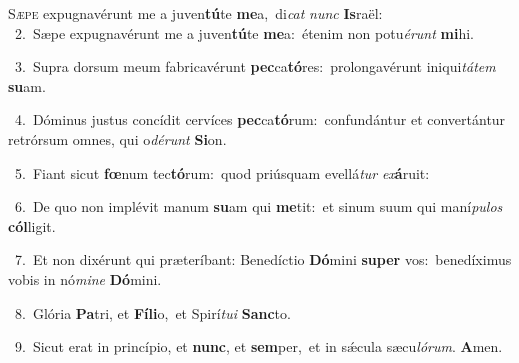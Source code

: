 \lettrine{\initial\textcolor{\initialcolor}{S}}{æpe} expugnavérunt me a juven\-\textbf{tú}\-te \textbf{me}\-a,~\star di\textit{cat} \textit{nunc} \textbf{Is}\-raël:\\
{\numbfont\textcolor{\numbcolor}{~2.}}~Sæpe expugnavérunt me a juven\-\textbf{tú}\-te \textbf{me}\-a:~\star étenim non potu\-\textit{é}\-\textit{runt} \textbf{mi}\-hi.\par
{\numbfont\textcolor{\numbcolor}{~3.}}~Supra dorsum meum fabricavérunt \textbf{pec}\-ca\-\textbf{tó}\-res:~\star prolongavérunt iniqui\-\textit{tá}\-\textit{tem} \textbf{su}\-am.\par
{\numbfont\textcolor{\numbcolor}{~4.}}~Dóminus justus concídit cervíces \textbf{pec}\-ca\-\textbf{tó}\-rum:~\star confundántur et convertántur retrórsum omnes, qui o\-\textit{dé}\-\textit{runt} \textbf{Si}\-on.\par
{\numbfont\textcolor{\numbcolor}{~5.}}~Fiant sicut \textbf{fœ}\-num tec\-\textbf{tó}\-rum:~\star quod priúsquam evellá\textit{tur} \textit{ex}\-\textbf{á}ruit:\par
{\numbfont\textcolor{\numbcolor}{~6.}}~De quo non implévit manum \textbf{su}\-am qui \textbf{me}\-tit:~\star et sinum suum qui maní\-\textit{pu}\-\textit{los} \textbf{cól}\-ligit.\par
{\numbfont\textcolor{\numbcolor}{~7.}}~Et non dixérunt qui præteríbant: Benedíctio \textbf{Dó}\-mini \textbf{su}\-\textbf{per} vos:~\star benedíximus vobis in nó\-\textit{mi}\-\textit{ne} \textbf{Dó}\-mini.\par
{\numbfont\textcolor{\numbcolor}{~8.}}~Glória \textbf{Pa}\-tri, et \textbf{Fí}\-\textbf{li}o,~\star et Spirí\-\textit{tu}\-\textit{i} \textbf{Sanc}\-to.\par
{\numbfont\textcolor{\numbcolor}{~9.}}~Sicut erat in princípio, et \textbf{nunc}\-, et \textbf{sem}\-per,~\star et in sǽcula sæcu\-\textit{ló}\-\textit{rum}. \textbf{A}\-men.\par
